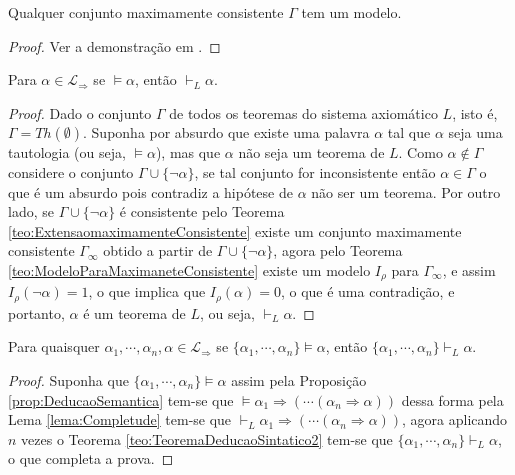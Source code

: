 \begin{theorem}\label{teo:ModeloParaMaximaneteConsistente}
    Qualquer conjunto maximamente consistente $\Gamma$ tem um modelo.
\end{theorem}

\begin{proof}
    Ver a demonstração em \cite{joaoPavao2014}.
\end{proof}

\begin{lema}\label{lema:Completude}
    Para $\alpha \in \mathcal{L}_{\Rightarrow}$ se $\vDash \alpha$, então $\vdash_L \alpha$.
\end{lema}

\begin{proof}
    Dado o conjunto $\Gamma$ de todos os teoremas do sistema axiomático $L$, isto é, $\Gamma = Th(\emptyset)$. Suponha por absurdo que existe uma palavra $\alpha$ tal que $\alpha$ seja uma tautologia (ou seja, $\vDash \alpha$), mas que $\alpha$ não seja um teorema de $L$. Como $\alpha \notin \Gamma$ considere o conjunto $\Gamma \cup \{\neg \alpha\}$, se tal conjunto for inconsistente então $\alpha \in \Gamma$ o que é um absurdo pois contradiz a hipótese de $\alpha$ não ser um teorema. Por outro lado, se $\Gamma \cup \{\neg \alpha\}$ é consistente pelo Teorema \ref{teo:ExtensaomaximamenteConsistente} existe um conjunto maximamente consistente $\Gamma_\infty$ obtido a partir de $\Gamma \cup \{\neg \alpha\}$, agora pelo Teorema \ref{teo:ModeloParaMaximaneteConsistente} existe um modelo $I_\rho$ para $\Gamma_\infty$, e assim $I_\rho(\neg \alpha) = 1$, o que implica que $I_\rho(\alpha) = 0$, o que é uma contradição, e portanto, $\alpha$ é um teorema de $L$, ou seja, $\vdash_L \alpha$.
\end{proof}

\begin{theorem}\label{teo:Completude}
    Para quaisquer $\alpha_1, \cdots, \alpha_n, \alpha \in \mathcal{L}_{\Rightarrow}$ se $\{\alpha_1, \cdots, \alpha_n\} \vDash \alpha$, então $\{\alpha_1, \cdots, \alpha_n\} \vdash_L \alpha$.
\end{theorem}

\begin{proof}
    Suponha que $\{\alpha_1, \cdots, \alpha_n\} \vDash \alpha$ assim pela Proposição \ref{prop:DeducaoSemantica} tem-se que $\vDash \alpha_1 \Rightarrow ( \cdots ( \alpha_n \Rightarrow \alpha))$ dessa forma pela Lema \ref{lema:Completude} tem-se que $\vdash_L \alpha_1 \Rightarrow ( \cdots ( \alpha_n \Rightarrow \alpha))$, agora aplicando $n$ vezes o Teorema \ref{teo:TeoremaDeducaoSintatico2}  tem-se que $\{\alpha_1, \cdots, \alpha_n\} \vdash_L \alpha$, o que completa a prova.
\end{proof}

